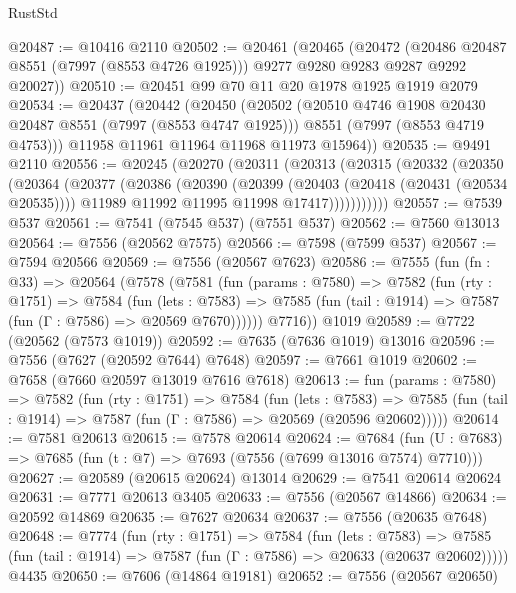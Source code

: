 \begin{lexlean}{RustStd}
\begin{coremodule}
{\begin{coremodule}
{{{{{{{{{{{{{{{{{{{{{{{{{{{{{{{{{{{{{{{{{{{@20487 := @10416 @2110
@20502 := @20461
    (@20465
      (@20472
        (@20486 @20487 @8551 (@7997 (@8553 @4726 @1925)))
        @9277
        @9280
        @9283
        @9287
        @9292
        @20027))
@20510 := @20451 @99 @70 @11 @20 @1978 @1925 @1919 @2079
@20534 := @20437
    (@20442
      (@20450
        (@20502
          (@20510 @4746 @1908 @20430 @20487 @8551 (@7997 (@8553 @4747 @1925)))
          @8551
          (@7997 (@8553 @4719 @4753)))
        @11958
        @11961
        @11964
        @11968
        @11973
        @15964))
@20535 := @9491 @2110
@20556 := @20245
    (@20270
      (@20311
        (@20313
          (@20315
            (@20332
              (@20350
                (@20364
                  (@20377
                    (@20386
                      (@20390
                        (@20399
                          (@20403 (@20418 (@20431 (@20534 @20535))))
                          @11989
                          @11992
                          @11995
                          @11998
                          @17417)))))))))))
@20557 := @7539 @537
@20561 := @7541 (@7545 @537) (@7551 @537)
@20562 := @7560 @13013
@20564 := @7556 (@20562 @7575)
@20566 := @7598 (@7599 @537)
@20567 := @7594 @20566
@20569 := @7556 (@20567 @7623)
@20586 := @7555
    (fun (fn : @33) =>
    @20564
      (@7578
        (@7581
          (fun (params : @7580) =>
          @7582
            (fun (rty : @1751) =>
            @7584
              (fun (lets : @7583) =>
              @7585 (fun (tail : @1914) => @7587 (fun (Γ : @7586) => @20569 @7670))))))
        @7716))
    @1019
@20589 := @7722 (@20562 (@7573 @1019))
@20592 := @7635 (@7636 @1019) @13016
@20596 := @7556 (@7627 (@20592 @7644) @7648)
@20597 := @7661 @1019
@20602 := @7658 (@7660 @20597 @13019 @7616 @7618)
@20613 := fun (params : @7580) =>
  @7582
    (fun (rty : @1751) =>
    @7584
      (fun (lets : @7583) =>
      @7585 (fun (tail : @1914) => @7587 (fun (Γ : @7586) => @20569 (@20596 @20602)))))
@20614 := @7581 @20613
@20615 := @7578 @20614
@20624 := @7684
    (fun (U : @7683) => @7685 (fun (t : @7) => @7693 (@7556 (@7699 @13016 @7574) @7710)))
@20627 := @20589 (@20615 @20624) @13014
@20629 := @7541 @20614 @20624
@20631 := @7771 @20613 @3405
@20633 := @7556 (@20567 @14866)
@20634 := @20592 @14869
@20635 := @7627 @20634
@20637 := @7556 (@20635 @7648)
@20648 := @7774
    (fun (rty : @1751) =>
    @7584
      (fun (lets : @7583) =>
      @7585 (fun (tail : @1914) => @7587 (fun (Γ : @7586) => @20633 (@20637 @20602)))))
    @4435
@20650 := @7606 (@14864 @19181)
@20652 := @7556 (@20567 @20650)
}}}}}}}}}}}}}}}}}}}}}}}}}}}}}}}}}}}}}}}}}}}
\end{coremodule}}
\end{coremodule}
\end{lexlean}
